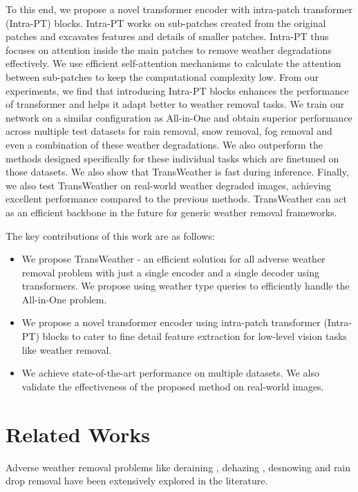 \documentclass[10pt,twocolumn,letterpaper]{article}
\begin{document}
To this end, we propose a novel transformer encoder with intra-patch transformer (Intra-PT) blocks. Intra-PT works on sub-patches created from the original patches and excavates features and details of smaller patches.  Intra-PT thus focuses on attention inside the main patches to remove weather degradations effectively. We use efficient self-attention mechanisms to calculate the attention between sub-patches to keep the computational complexity low. From our experiments, we find that introducing Intra-PT blocks enhances the performance of transformer and helps it adapt better to weather removal tasks. We train our network on a similar configuration as All-in-One and obtain superior performance across multiple test datasets for rain removal, snow removal, fog removal and even a combination of these weather degradations. We also outperform the methods designed specifically for these individual tasks which are finetuned on those datasets. We also show that TransWeather is fast during inference. Finally, we also test TransWeather on real-world weather degraded images, achieving excellent performance compared to the previous methods. TransWeather can act as an efficient backbone in the future for generic weather removal frameworks.

The key contributions of this work are as follows:

\begin{itemize}[topsep=0pt,noitemsep,leftmargin=*]
	\item  We propose TransWeather - an efficient solution for all adverse weather removal problem with just a single encoder and a single decoder using transformers. We propose using weather type queries to efficiently handle the All-in-One problem.
	\item  We propose a novel transformer encoder using intra-patch transformer (Intra-PT) blocks to cater to fine detail feature extraction for low-level vision tasks like weather removal. 
	\item We achieve state-of-the-art performance on multiple datasets. We also validate the effectiveness of the proposed method on real-world images. 
\end{itemize}





\section{Related Works}

Adverse weather removal problems like deraining \cite{li2018recurrent, yang2019joint, li2019heavy,kang2011automatic,zhu2017joint, yasarla2020exploring, wang2020model}, dehazing \cite{cai2016dehazenet, berman2016non, zhang2018density, fattal2014dehazing, li2018single, ren2016single}, desnowing \cite{ren2017video, liu2018desnownet, ren2017video, zhang2021deep} and rain drop removal \cite{qian2018attentive, quan2019deep, quan2021removing, you2015adherent} have been extensively explored in the literature.
\end{document}
